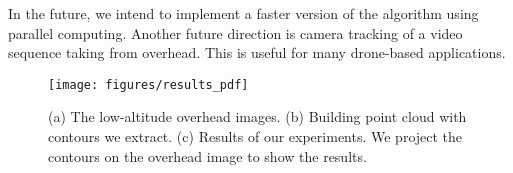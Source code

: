 
%
In the future, we intend to implement a faster version of the algorithm using parallel computing.
%
Another future direction is camera tracking of a video sequence taking from overhead. This is useful for many drone-based applications.

\begin{figure}[b]
	\centering
	\texttt{[image: figures/results\_pdf]}
	\caption{(a) The low-altitude overhead images. (b) Building point cloud with contours we extract. (c) Results of our experiments. We project the contours on the overhead image to show the results. }
	\label{fig:comparison}
\end{figure}

